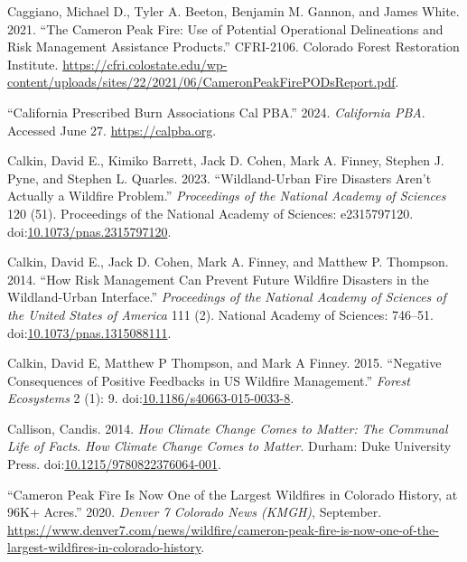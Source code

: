 \documentclass[
]{article}
\newlength{\cslhangindent}
\newenvironment{CSLReferences}[2] %
 {\begin{list}{}{%
  \setlength{\itemindent}{0pt}
  \setlength{\leftmargin}{0pt}
  \setlength{\parsep}{0pt}
  \ifodd #1
   \setlength{\leftmargin}{\cslhangindent}
   \setlength{\itemindent}{-1\cslhangindent}
  \fi
  \setlength{\itemsep}{#2\baselineskip}}}
 {\end{list}}
\begin{document}
\begin{CSLReferences}{1}{0}
Caggiano, Michael D., Tyler A. Beeton, Benjamin M. Gannon, and James White. 2021. {``The {Cameron Peak Fire}: {Use} of {Potential Operational Delineations} and {Risk Management Assistance Products}.''} CFRI-2106. Colorado Forest Restoration Institute. \url{https://cfri.colostate.edu/wp-content/uploads/sites/22/2021/06/CameronPeakFirePODsReport.pdf}.

{``California {Prescribed Burn Associations Cal PBA}.''} 2024. \emph{California PBA}. Accessed June 27. \url{https://calpba.org}.

Calkin, David E., Kimiko Barrett, Jack D. Cohen, Mark A. Finney, Stephen J. Pyne, and Stephen L. Quarles. 2023. {``Wildland-Urban Fire Disasters Aren't Actually a Wildfire Problem.''} \emph{Proceedings of the National Academy of Sciences} 120 (51). Proceedings of the National Academy of Sciences: e2315797120. doi:\href{https://doi.org/10.1073/pnas.2315797120}{10.1073/pnas.2315797120}.

Calkin, David E., Jack D. Cohen, Mark A. Finney, and Matthew P. Thompson. 2014. {``How Risk Management Can Prevent Future Wildfire Disasters in the Wildland-Urban Interface.''} \emph{Proceedings of the National Academy of Sciences of the United States of America} 111 (2). National Academy of Sciences: 746--51. doi:\href{https://doi.org/10.1073/pnas.1315088111}{10.1073/pnas.1315088111}.

Calkin, David E, Matthew P Thompson, and Mark A Finney. 2015. {``Negative Consequences of Positive Feedbacks in {US} Wildfire Management.''} \emph{Forest Ecosystems} 2 (1): 9. doi:\href{https://doi.org/10.1186/s40663-015-0033-8}{10.1186/s40663-015-0033-8}.

Callison, Candis. 2014. \emph{How Climate Change Comes to Matter: {The Communal Life} of {Facts}}. \emph{How Climate Change Comes to Matter}. Durham: Duke University Press. doi:\href{https://doi.org/10.1215/9780822376064-001}{10.1215/9780822376064-001}.

{``Cameron {Peak Fire} Is Now One of the Largest Wildfires in {Colorado} History, at {96K}+ Acres.''} 2020. \emph{Denver 7 Colorado News (KMGH)}, September. \url{https://www.denver7.com/news/wildfire/cameron-peak-fire-is-now-one-of-the-largest-wildfires-in-colorado-history}.


\end{CSLReferences}
\end{document}
